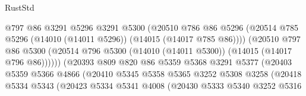 \begin{lexlean}{RustStd}
\begin{coremodule}
                                      @797
                                      @86
                                      @3291
                                      @5296
                                      @3291
                                      @5300
                                      (@20510
                                        @786
                                        @86
                                        @5296
                                        (@20514
                                          @785
                                          @5296
                                          (@14010 (@14011 @5296))
                                          (@14015 (@14017 @785 @86))))
                                      (@20510
                                        @797
                                        @86
                                        @5300
                                        (@20514
                                          @796
                                          @5300
                                          (@14010 (@14011 @5300))
                                          (@14015 (@14017 @796 @86))))))
                                  (@20393
                                    @809
                                    @820
                                    @86
                                    @5359
                                    @5368
                                    @3291
                                    @5377
                                    (@20403
                                      @5359
                                      @5366
                                      @4866
                                      (@20410
                                        @5345
                                        @5358
                                        @5365
                                        @3252
                                        @5308
                                        @3258
                                        (@20418
                                          @5334
                                          @5343
                                          (@20423
                                            @5334
                                            @5341
                                            @4008
                                            (@20430
                                              @5333
                                              @5340
                                              @3252
                                              @5316

\end{coremodule}
\end{lexlean}
